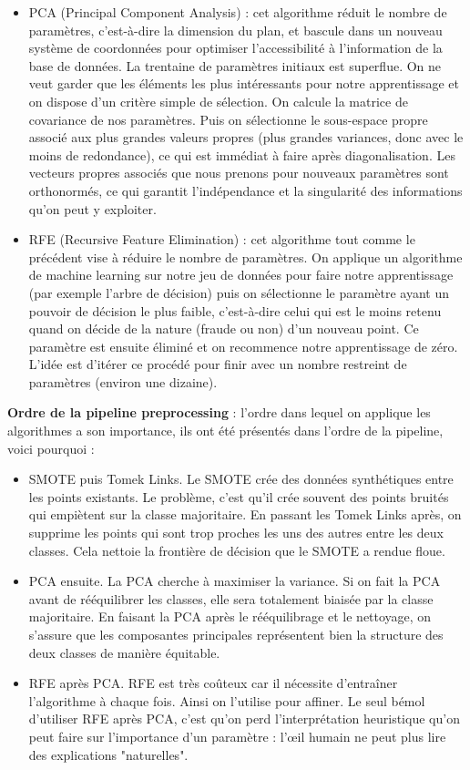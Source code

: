 \documentclass[a4paper]{article}
\begin{document}
\begin{itemize}
\item PCA (Principal Component Analysis) : cet algorithme réduit le nombre de paramètres, c'est-à-dire la dimension du plan, et bascule dans un nouveau système de coordonnées pour optimiser l'accessibilité à l'information de la base de données. La trentaine de paramètres initiaux est superflue. On ne veut garder que les éléments les plus intéressants pour notre apprentissage et on dispose d'un critère simple de sélection. On calcule la matrice de covariance de nos paramètres. Puis on sélectionne le sous-espace propre associé aux plus grandes valeurs propres (plus grandes variances, donc avec le moins de redondance), ce qui est immédiat à faire après diagonalisation. Les vecteurs propres associés que nous prenons pour nouveaux paramètres sont orthonormés, ce qui garantit l'indépendance et la singularité des informations qu'on peut y exploiter.

\item RFE (Recursive Feature Elimination) : cet algorithme tout comme le précédent vise à réduire le nombre de paramètres. On applique un algorithme de machine learning sur notre jeu de données pour faire notre apprentissage (par exemple l'arbre de décision) puis on sélectionne le paramètre ayant un pouvoir de décision le plus faible, c'est-à-dire celui qui est le moins retenu quand on décide de la nature (fraude ou non) d'un nouveau point. Ce paramètre est ensuite éliminé et on recommence notre apprentissage de zéro. L'idée est d'itérer ce procédé pour finir avec un nombre restreint de paramètres (environ une dizaine).
\end{itemize}

\textbf{Ordre de la pipeline preprocessing} : l'ordre dans lequel on applique les algorithmes a son importance, ils ont été présentés dans l'ordre de la pipeline, voici pourquoi :

\begin{itemize}
\item SMOTE puis Tomek Links. Le SMOTE crée des données synthétiques entre les points existants. Le problème, c'est qu'il crée souvent des points bruités qui empiètent sur la classe majoritaire. En passant les Tomek Links après, on supprime les points qui sont trop proches les uns des autres entre les deux classes. Cela nettoie la frontière de décision que le SMOTE a rendue floue.

\item PCA ensuite. La PCA cherche à maximiser la variance. Si on fait la PCA avant de rééquilibrer les classes, elle sera totalement biaisée par la classe majoritaire. En faisant la PCA après le rééquilibrage et le nettoyage, on s'assure que les composantes principales représentent bien la structure des deux classes de manière équitable.

\item RFE après PCA. RFE est très coûteux car il nécessite d'entraîner l'algorithme à chaque fois. Ainsi on l'utilise pour affiner. Le seul bémol d'utiliser RFE après PCA, c'est qu'on perd l'interprétation heuristique qu'on peut faire sur l'importance d'un paramètre : l'œil humain ne peut plus lire des explications "naturelles".
\end{itemize}
\end{document}
